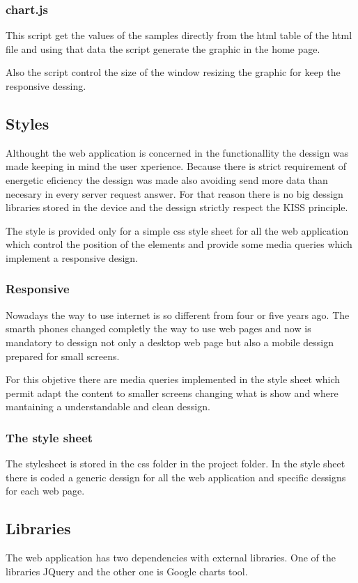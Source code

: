 		\subsubsection{chart.js}
		This script get the values of the samples directly from the html table of the html file and using that data the script generate the graphic in the home page.

		Also the script control the size of the window resizing the graphic for keep the responsive dessing.

		\subsection{Styles} %
		Althought the web application is concerned in the functionallity the dessign was made keeping in mind the user xperience. Because there is strict requirement of energetic eficiency the dessign was made also avoiding send more data than necesary in every server request answer. For that reason there is no big dessign libraries stored in the device and the dessign strictly respect the KISS principle.

		The style is provided only for a simple css style sheet for all the web application which control the position of the elements and provide some media queries which implement a responsive design.

		\subsubsection{Responsive}
		Nowadays the way to use internet is so different from four or five years ago. The smarth phones changed completly the way to use web pages and now is mandatory to dessign not only a desktop web page but also a mobile dessign prepared for small screens. 

		For this objetive there are media queries implemented in the style sheet which permit adapt the content to smaller screens changing what is show and where mantaining a understandable and clean dessign.

		\subsubsection{The style sheet}
		The stylesheet is stored in the css folder in the project folder. In the style sheet there is coded a generic dessign for all the web application and specific dessigns for each web page.

		\subsection{Libraries}%
		The web application has two dependencies with external libraries. One of the libraries JQuery and the other one is Google charts tool.

